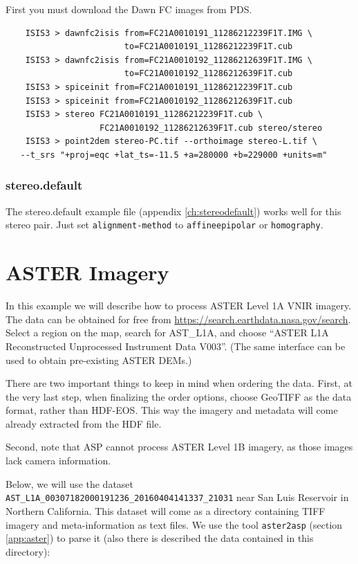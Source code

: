 First you must download the Dawn FC images from PDS.

\begin{verbatim}
    ISIS3 > dawnfc2isis from=FC21A0010191_11286212239F1T.IMG \
                        to=FC21A0010191_11286212239F1T.cub
    ISIS3 > dawnfc2isis from=FC21A0010192_11286212639F1T.IMG \
                        to=FC21A0010192_11286212639F1T.cub
    ISIS3 > spiceinit from=FC21A0010191_11286212239F1T.cub
    ISIS3 > spiceinit from=FC21A0010192_11286212639F1T.cub
    ISIS3 > stereo FC21A0010191_11286212239F1T.cub \
                   FC21A0010192_11286212639F1T.cub stereo/stereo
    ISIS3 > point2dem stereo-PC.tif --orthoimage stereo-L.tif \
   --t_srs "+proj=eqc +lat_ts=-11.5 +a=280000 +b=229000 +units=m"
\end{verbatim}

\subsubsection*{stereo.default}

The stereo.default example file (appendix \ref{ch:stereodefault})
works well for this stereo pair. Just set
\texttt{alignment-method} to \texttt{affineepipolar} or
\texttt{homography}.


\section{ASTER Imagery}
\label{sec:aster}

In this example we will describe how to process ASTER Level 1A VNIR imagery. 
The data can be obtained for free from 
\url{https://search.earthdata.nasa.gov/search}. Select a region on the map,
search for AST\_L1A, and choose 
``ASTER L1A Reconstructed Unprocessed Instrument Data V003''.
(The same interface can be used to obtain pre-existing ASTER DEMs.)

There are two important things to keep in mind when ordering the data.
First, at the very last step, when finalizing the order options, 
choose GeoTIFF as the data format, rather than HDF-EOS. 
This way the imagery and metadata will come already extracted from the HDF file.

Second, note that ASP cannot process ASTER Level 1B imagery, as those
images lack camera information.

Below, we will use the dataset
\texttt{AST\_L1A\_00307182000191236\_20160404141337\_21031} near San Luis
Reservoir in Northern California. This dataset will come as a directory
containing TIFF imagery and meta-information as text files. We use the
tool \texttt{aster2asp} (section \ref{app:aster}) to parse it (also
there is described the data contained in this directory):

